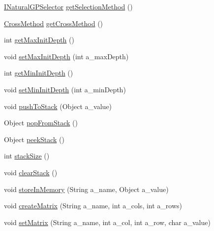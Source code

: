\begin{DoxyCompactItemize}
\item 
\hyperlink{interfaceorg_1_1jgap_1_1gp_1_1_i_natural_g_p_selector}{I\-Natural\-G\-P\-Selector} \hyperlink{classorg_1_1jgap_1_1gp_1_1impl_1_1_g_p_configuration_a5cceb36c0dd1b7efe4f48204fd84a650}{get\-Selection\-Method} ()
\item 
\hyperlink{classorg_1_1jgap_1_1gp_1_1_cross_method}{Cross\-Method} \hyperlink{classorg_1_1jgap_1_1gp_1_1impl_1_1_g_p_configuration_a97e1bdbd73b2d2b64ad314cdedeb377b}{get\-Cross\-Method} ()
\item 
int \hyperlink{classorg_1_1jgap_1_1gp_1_1impl_1_1_g_p_configuration_a78aeb9a3629d08572c09407a77b4be02}{get\-Max\-Init\-Depth} ()
\item 
void \hyperlink{classorg_1_1jgap_1_1gp_1_1impl_1_1_g_p_configuration_af13fbc4246130887139f0ce31155deec}{set\-Max\-Init\-Depth} (int a\-\_\-max\-Depth)
\item 
int \hyperlink{classorg_1_1jgap_1_1gp_1_1impl_1_1_g_p_configuration_a688753ca8ca741f2e023648448e24f30}{get\-Min\-Init\-Depth} ()
\item 
void \hyperlink{classorg_1_1jgap_1_1gp_1_1impl_1_1_g_p_configuration_aa76e407cb1a4888201e56e36ce38126b}{set\-Min\-Init\-Depth} (int a\-\_\-min\-Depth)
\item 
void \hyperlink{classorg_1_1jgap_1_1gp_1_1impl_1_1_g_p_configuration_a2d0807c697fe5ad4cb698c20b22430f1}{push\-To\-Stack} (Object a\-\_\-value)
\item 
Object \hyperlink{classorg_1_1jgap_1_1gp_1_1impl_1_1_g_p_configuration_a9db7b221a3e4ecf0dc4e5846dccc3d64}{pop\-From\-Stack} ()
\item 
Object \hyperlink{classorg_1_1jgap_1_1gp_1_1impl_1_1_g_p_configuration_a07fb497b5d1697ba8546420f31eec8b5}{peek\-Stack} ()
\item 
int \hyperlink{classorg_1_1jgap_1_1gp_1_1impl_1_1_g_p_configuration_a434f68d9f06d04b9f5b199fd746934e0}{stack\-Size} ()
\item 
void \hyperlink{classorg_1_1jgap_1_1gp_1_1impl_1_1_g_p_configuration_ab0d8fa921279c053c53b7d96d7ad6505}{clear\-Stack} ()
\item 
void \hyperlink{classorg_1_1jgap_1_1gp_1_1impl_1_1_g_p_configuration_abc5fe8b70ba0204e24f65f8ad4d569e5}{store\-In\-Memory} (String a\-\_\-name, Object a\-\_\-value)
\item 
void \hyperlink{classorg_1_1jgap_1_1gp_1_1impl_1_1_g_p_configuration_a87edf08f1aad2c8e4dd43944c5f7f8ac}{create\-Matrix} (String a\-\_\-name, int a\-\_\-cols, int a\-\_\-rows)
\item 
void \hyperlink{classorg_1_1jgap_1_1gp_1_1impl_1_1_g_p_configuration_a66856198fb3ba43817005b764fd82b45}{set\-Matrix} (String a\-\_\-name, int a\-\_\-col, int a\-\_\-row, char a\-\_\-value)

\end{DoxyCompactItemize}
